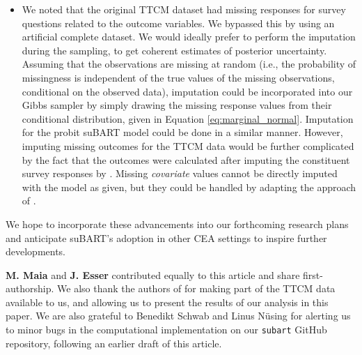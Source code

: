 \documentclass[aoas,preprint]{imsart}
\theoremstyle{plain}
\theoremstyle{definition}
\theoremstyle{remark}
\begin{document}
\begin{itemize}[wide]
    \item We noted that the original TTCM dataset had missing responses for survey questions related to the outcome variables. We bypassed this by using an artificial complete dataset. We would ideally prefer to perform the imputation during the sampling, to get coherent estimates of posterior uncertainty. Assuming that the observations are missing at random (i.e., the probability of missingness is independent of the true values of the missing observations, conditional on the observed data), imputation could be incorporated into our Gibbs sampler by simply drawing the missing response values from their conditional distribution, given in Equation \eqref{eq:marginal_normal}. Imputation for the probit suBART model could be done in a similar manner. However, imputing missing outcomes for the TTCM data would be further complicated by the fact that the outcomes were calculated after imputing the constituent survey responses by \citet{wiertsema2019cost}. 
    Missing \textit{covariate} values cannot be directly imputed with the model as given, but they could be handled by adapting the approach of \citet{kapelner2016bartmachine}.
\end{itemize}

We hope to incorporate these advancements into our forthcoming research plans and anticipate suBART's adoption in other CEA settings to inspire further developments.

\begin{acks}[Acknowledgments]
\small
\textbf{M. Maia} and \textbf{J. Esser} contributed equally to this article and share first-authorship. %
We also thank the authors of \citet{wiertsema2019cost} for making part of the TTCM data available to us, and allowing us to present the results of our analysis in this paper. We are also grateful to Benedikt Schwab and Linus N{\"{u}}sing for alerting us to minor bugs in the computational implementation on our \texttt{subart} GitHub repository, following an earlier draft of this article.
\end{acks}
\end{document}
